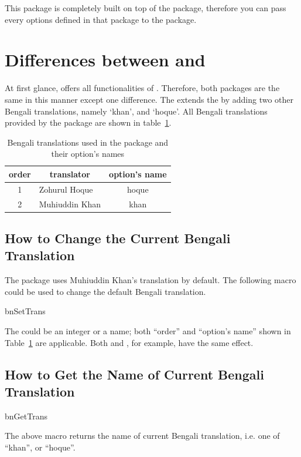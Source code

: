 \documentclass[a4paper]{ltxdoc}
\begin{document}
This package is completely built on top of the  package, therefore you can pass every options
defined in that package to the  package.

\section{Differences between  and }
At first glance,   offers all functionalities of . Therefore,
both packages are the same in this manner except one difference. The  extends the 
by adding two other Bengali translations, namely `khan', and `hoque'. All Bengali translations
provided by the package are shown in table~\ref{tab:bntrans}.

\begin{table}[!htbp]
\centering
\begin{tabular}{|c|l|c|}
    \toprule
    order & \multicolumn{1}{c|}{translator} & option's name \\\midrule
    1 & Zohurul Hoque & hoque \\
    2 & 	Muhiuddin Khan & khan \\
    \bottomrule
\end{tabular}
    \caption{Bengali translations used in the package and their option's names}
    \label{tab:bntrans}
\end{table}

\subsection{How to Change the Current Bengali Translation}
    The  package uses Muhiuddin Khan's translation by default.
    The following macro could be used to change the default Bengali translation.
    \begin{declcs}{bnSetTrans}
    \end{declcs}
    The  could be an integer or a name; both ``order'' and ``option's name''
    shown in Table~\ref{tab:bntrans} are applicable. Both  and , for example,
    have the same effect.

\subsection{How to Get the Name of Current Bengali Translation}
    \begin{declcs}{bnGetTrans}
    \end{declcs}
    The above macro returns the name of current Bengali translation, i.e.  one of ``khan'', or ``hoque''.
\end{document}
